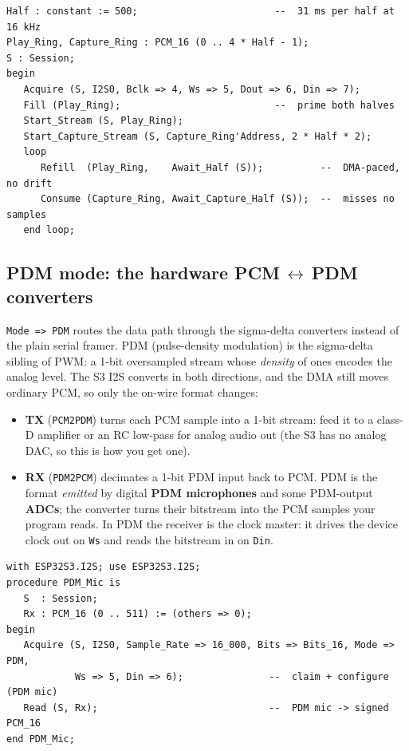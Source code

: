 \begin{lstlisting}
Half : constant := 500;                        --  31 ms per half at 16 kHz
Play_Ring, Capture_Ring : PCM_16 (0 .. 4 * Half - 1);
S : Session;
begin
   Acquire (S, I2S0, Bclk => 4, Ws => 5, Dout => 6, Din => 7);
   Fill (Play_Ring);                           --  prime both halves
   Start_Stream (S, Play_Ring);
   Start_Capture_Stream (S, Capture_Ring'Address, 2 * Half * 2);
   loop
      Refill  (Play_Ring,    Await_Half (S));          --  DMA-paced, no drift
      Consume (Capture_Ring, Await_Capture_Half (S));  --  misses no samples
   end loop;
\end{lstlisting}

\subsection{PDM mode: the hardware PCM\,$\leftrightarrow$\,PDM converters}

\texttt{Mode => PDM} routes the data path through the sigma-delta converters
instead of the plain serial framer. PDM (pulse-density modulation) is the
sigma-delta sibling of PWM: a 1-bit oversampled stream whose \emph{density} of
ones encodes the analog level. The S3 I2S converts in both directions, and the
DMA still moves ordinary PCM, so only the on-wire format changes:

\begin{itemize}
  \item \textbf{TX} (\texttt{PCM2PDM}) turns each PCM sample into a 1-bit stream:
        feed it to a class-D amplifier or an RC low-pass for analog audio out
        (the S3 has no analog DAC, so this is how you get one).
  \item \textbf{RX} (\texttt{PDM2PCM}) decimates a 1-bit PDM input back to PCM.
        PDM is the format \emph{emitted} by digital \textbf{PDM microphones} and
        some PDM-output \textbf{ADCs}; the converter turns their bitstream into the
        PCM samples your program reads. In PDM the receiver is the clock master:
        it drives the device clock out on \texttt{Ws} and reads the bitstream in on
        \texttt{Din}.
\end{itemize}

\begin{lstlisting}
with ESP32S3.I2S; use ESP32S3.I2S;
procedure PDM_Mic is
   S  : Session;
   Rx : PCM_16 (0 .. 511) := (others => 0);
begin
   Acquire (S, I2S0, Sample_Rate => 16_000, Bits => Bits_16, Mode => PDM,
            Ws => 5, Din => 6);               --  claim + configure (PDM mic)
   Read (S, Rx);                              --  PDM mic -> signed PCM_16
end PDM_Mic;
\end{lstlisting}

